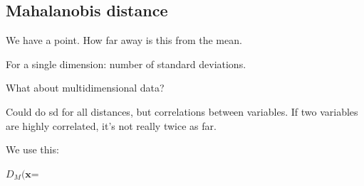 
\subsection{Mahalanobis distance}

We have a point. How far away is this from the mean.

For a single dimension: number of standard deviations.

What about multidimensional data?

Could do sd for all distances, but correlations between variables. If two variables are highly correlated, it's not really twice as far.

We use this:

\(D_M(\mathbf x\)=\)

